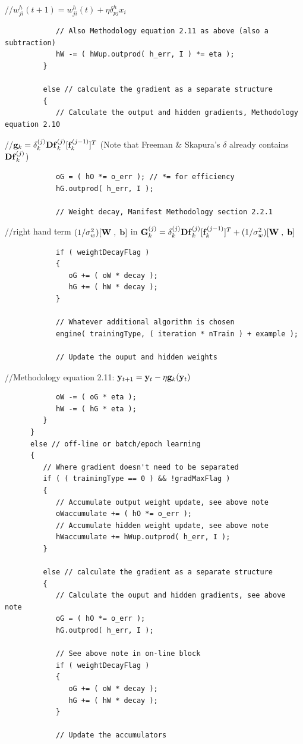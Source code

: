 \documentclass{report}[10pt]
\begin{document}
\hspace{48 pt}//\hspace{4 pt}$w^h_{ji}(t+1)=w^h_{ji}(t)+\eta\delta^h_{pj}x_i$
\begin{verbatim}
            // Also Methodology equation 2.11 as above (also a subtraction)
            hW -= ( hWup.outprod( h_err, I ) *= eta );
         }

         else // calculate the gradient as a separate structure
         {
            // Calculate the output and hidden gradients, Methodology equation 2.10
\end{verbatim}
\hspace{48 pt}//\hspace{4 pt}${\bf g}_k = \delta^{(j)}_k{\bf Df}^{(j)}_k[{\bf f}^{(j-1)}_k]^T$
(Note that Freeman \& Skapura's $\delta$ already contains ${\bf Df}^{(j)}_k$)
\begin{verbatim}
            oG = ( hO *= o_err ); // *= for efficiency
            hG.outprod( h_err, I );

            // Weight decay, Manifest Methodology section 2.2.1
\end{verbatim}
\hspace{48 pt}//\hspace{4 pt}right hand term $(1/\sigma_w^2)[{\bf W} \;,\; {\bf b}]$
in ${\bf G}^{(j)}_k=\delta^{(j)}_k{\bf Df}^{(j)}_k[{\bf f}^{(j-1)}_k]^T+(1/\sigma_w^2)[{\bf W}\;,\;{\bf b}]$
\begin{verbatim}
            if ( weightDecayFlag )
            {
               oG += ( oW * decay );
               hG += ( hW * decay );
            }

            // Whatever additional algorithm is chosen
            engine( trainingType, ( iteration * nTrain ) + example );

            // Update the ouput and hidden weights
\end{verbatim}
\hspace{48 pt}//\hspace{4 pt}Methodology equation 2.11: ${\bf y}_{t+1} = {\bf y}_t - \eta {\bf g}_k({\bf y}_t)$
\begin{verbatim}
            oW -= ( oG * eta );
            hW -= ( hG * eta );
         }
      }
      else // off-line or batch/epoch learning
      {
         // Where gradient doesn't need to be separated
         if ( ( trainingType == 0 ) && !gradMaxFlag )
         {
            // Accumulate output weight update, see above note
            oWaccumulate += ( hO *= o_err );
            // Accumulate hidden weight update, see above note
            hWaccumulate += hWup.outprod( h_err, I );
         }

         else // calculate the gradient as a separate structure
         {
            // Calculate the ouput and hidden gradients, see above note
            oG = ( hO *= o_err );
            hG.outprod( h_err, I );

            // See above note in on-line block
            if ( weightDecayFlag )
            {
               oG += ( oW * decay );
               hG += ( hW * decay );
            }

            // Update the accumulators
\end{verbatim}
\end{document}
